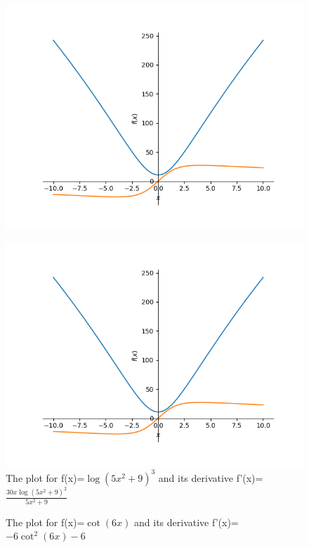 \documentclass{article}
\begin{document}
\begin{figure}
\includegraphics{plot_30}
\end{figure}\begin{figure}
\caption{The plot for f(x)=$\log{\left(5 x^{2} + 9 \right)}^{3}$ and its derivative f'(x)=$\frac{30 x \log{\left(5 x^{2} + 9 \right)}^{2}}{5 x^{2} + 9}$}
\centering
\includegraphics{plot_31}
\end{figure}\begin{figure}
\caption{The plot for f(x)=$\cot{\left(6 x \right)}$ and its derivative f'(x)=$- 6 \cot^{2}{\left(6 x \right)} - 6$}
\centering

\end{figure}
\end{document}
